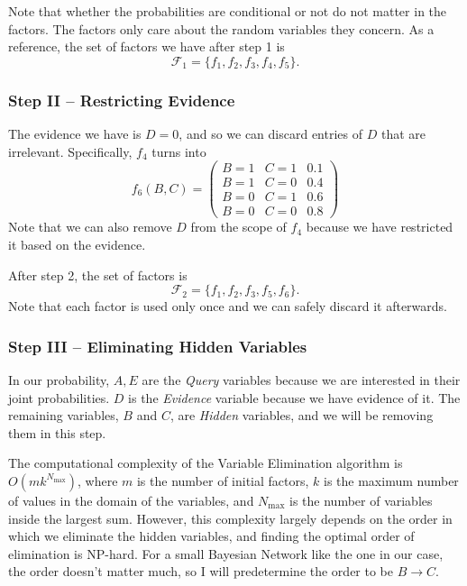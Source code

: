 \documentclass{article}
\theoremstyle{definition}
\begin{document}
Note that whether the probabilities are conditional or not do not matter in the factors. The factors only care about the random variables they concern. As a reference, the set of factors we have after step 1 is
\[\mathcal{F}_1 = \{f_1, f_2, f_3, f_4, f_5\}.\]

\subsubsection{Step II -- Restricting Evidence}

The evidence we have is \(D = 0\), and so we can discard entries of \(D\) that are irrelevant. Specifically, \(f_4\) turns into
\[f_6(B, C) = \begin{pmatrix}
    B = 1 & C = 1 & 0.1 \\
    B = 1 & C = 0 & 0.4 \\
    B = 0 & C = 1 & 0.6 \\
    B = 0 & C = 0 & 0.8
\end{pmatrix}\]
Note that we can also remove \(D\) from the scope of \(f_4\) because we have restricted it based on the evidence.

After step 2, the set of factors is
\[\mathcal{F}_2 = \{f_1, f_2, f_3, f_5, f_6\}.\]
Note that each factor is used only once and we can safely discard it afterwards.

\subsubsection{Step III -- Eliminating Hidden Variables}

In our probability, \(A, E\) are the \textit{Query} variables because we are interested in their joint probabilities. \(D\) is the \textit{Evidence} variable because we have evidence of it. The remaining variables, \(B\) and \(C\), are \textit{Hidden} variables, and we will be removing them in this step.

The computational complexity of the Variable Elimination algorithm is \(O(mk^{N_{\max}})\), where \(m\) is the number of initial factors, \(k\) is the maximum number of values in the domain of the variables, and \(N_{\max}\) is the number of variables inside the largest sum. However, this complexity largely depends on the order in which we eliminate the hidden variables, and finding the optimal order of elimination is \textsf{NP}-hard. For a small Bayesian Network like the one in our case, the order doesn't matter much, so I will predetermine the order to be \(B \to C\).
\end{document}

